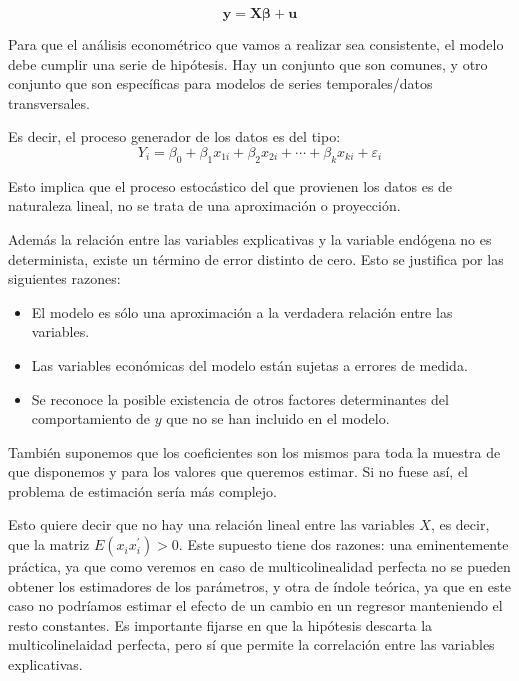 \begin{equation*}
\boldsymbol{y}=\boldsymbol{X\beta}+\boldsymbol{u}
\end{equation*}

Para que el an\'alisis econom\'etrico que vamos a realizar sea consistente, el modelo debe cumplir una serie de hip\'otesis. Hay un conjunto que son comunes, y otro conjunto que son espec\'ificas para modelos de series temporales/datos transversales.


Es decir, el proceso generador de los datos es del tipo: 
\begin{equation*}
Y_i=\beta_0+\beta_1x_{1i}+\beta_2x_{2i}+\cdots+\beta_kx_{ki}+\varepsilon_i
\end{equation*}

Esto implica que el proceso estoc\'astico del que provienen los datos es de naturaleza lineal, no se trata de una aproximaci\'on o proyecci\'on.

Adem\'as la relaci\'on entre las variables explicativas y la variable
end\'ogena no es determinista, existe un t\'ermino de error distinto de
cero. Esto se justifica por las siguientes razones:
\begin{itemize}
\item El modelo es s\'olo una aproximaci\'on a la verdadera relaci\'on entre las
variables.
\item Las variables econ\'omicas del modelo est\'an sujetas a errores de medida.
\item Se reconoce la posible existencia de otros factores determinantes
del comportamiento de $y$ que no se han incluido en el modelo.
\end{itemize}

Tambi\'en suponemos que los coeficientes son los mismos para toda la muestra
de que disponemos y para los valores que queremos estimar. Si no fuese
as\'i, el problema de estimaci\'on ser\'ia m\'as complejo.

Esto quiere decir que no hay una relaci\'on lineal entre las variables $X$, es decir, que la matriz $E(x_ix_i^{\prime})>0$. Este supuesto tiene dos razones: una eminentemente pr\'actica, ya que como veremos en caso de multicolinealidad perfecta no se pueden obtener los estimadores de los par\'ametros, y otra de \'indole te\'orica, ya que en este caso no podr\'iamos estimar el efecto de un cambio en un regresor manteniendo el resto constantes. Es importante fijarse en que la hip\'otesis descarta la multicolinelaidad perfecta, pero s\'i que permite la correlaci\'on entre las variables explicativas.

